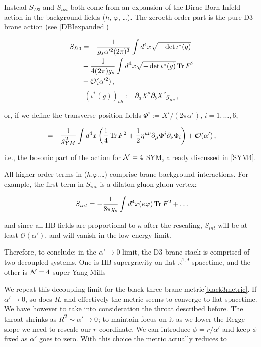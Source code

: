 Instead $S_{D3}$ and $S_{int}$ both come from an expansion of the Dirac-Born-Infeld action in the background fields ($h$, $\varphi$, \ldots). The zeroeth order part is the pure D3-brane action (see \eqref{DBIexpanded})

\begin{align}
	S_{D3} &= - \frac{1}{g_s \alpha'^2 (2\pi)^3} \int d^4 x \sqrt{-\det\iota^*(g)} \\&+ \frac{1}{4(2\pi)g_s} \int d^4 x \sqrt{-\det\iota^*(g)} \operatorname{Tr} F^2 \\&+ \mathcal{O}(\alpha'^2)\,,
	\label{}
\end{align}
\begin{equation}
	(\iota^*(g))_{ab} := \partial_a X^\mu \partial_b X^\nu g_{\mu\nu}\,,
	\label{}
\end{equation}

or, if we define the transverse position fields $\Phi^i := X^i / (2\pi\alpha')$, $i = 1,\ldots,6$,

\begin{equation}
	= - \frac{1}{g_{YM}^2} \int d^4 x \left( \frac{1}{4} \operatorname{Tr} F^2 + \frac{1}{2} \eta^{\mu\nu} \partial_\mu \Phi^i \partial_\nu \Phi_i \right) + \mathcal{O}(\alpha')\,;
	\label{}
\end{equation}

i.e., the bosonic part of the action for $\mathcal{N} = 4$ SYM, already discussed in \ref{SYM4}.

All higher-order terms in ($h$,$\varphi$,\ldots) comprise brane-background interactions. For example, the first term in $S_{int}$ is a dilaton-gluon-gluon vertex:

\begin{equation}
	S_{int} = - \frac{1}{8\pi g_s} \int d^4 x (\kappa \varphi) \operatorname{Tr} F^2 + \ldots
	\label{}
\end{equation}

and since all IIB fields are proportional to $\kappa$ after the rescaling, $S_{int}$ will be at least $\mathcal{O}(\alpha')$, and will vanish in the low-energy limit.

Therefore, to conclude: in the $\alpha' \rightarrow 0$ limit, the D3-brane stack is comprised of two decoupled systems. One is IIB supergravity on flat $\mathbb{R}^{1,9}$ spacetime, and the other is $\mathcal{N}=4$ super-Yang-Mills

We repeat this decoupling limit for the black three-brane metric\eqref{black3metric}. If $\alpha' \rightarrow 0$, so does $R$, and effectively the metric seems to converge to flat spacetime. We have however to take into consideration the throat described before. The throat shrinks as $R^2 \sim \alpha' \rightarrow 0$; to maintain focus on it as we lower the Regge slope we need to rescale our $r$ coordinate. We can introduce $\phi = r/\alpha'$ and keep $\phi$ fixed as $\alpha'$ goes to zero. With this choice the metric actually reduces to

